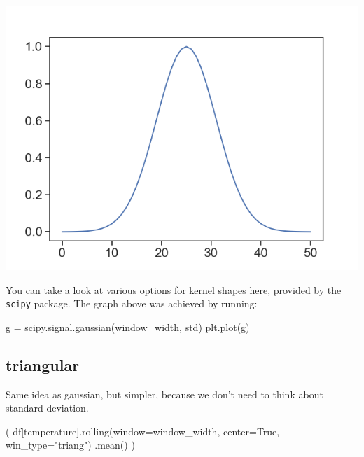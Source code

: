 \documentclass[
  letterpaper,
  DIV=11,
  numbers=noendperiod,
  oneside]{scrreprt}
\newenvironment{Shaded}{\begin{snugshade}}{\end{snugshade}}
\newcommand{\NormalTok}[1]{\textcolor[rgb]{0.00,0.23,0.31}{#1}}
\newcommand{\OperatorTok}[1]{\textcolor[rgb]{0.37,0.37,0.37}{#1}}
\newcommand{\StringTok}[1]{\textcolor[rgb]{0.13,0.47,0.30}{#1}}
\newcommand{\VariableTok}[1]{\textcolor[rgb]{0.07,0.07,0.07}{#1}}
\begin{document}
\includegraphics{smoothing/gaussian_kernel.png}

You can take a look at various options for kernel shapes
\href{https://docs.scipy.org/doc/scipy/reference/signal.windows.html\#module-scipy.signal.windows}{here},
provided by the \texttt{scipy} package. The graph above was achieved by
running:

\begin{Shaded}
\begin{Highlighting}[]
\NormalTok{g }\OperatorTok{=}\NormalTok{ scipy.signal.gaussian(window\_width, std)}
\NormalTok{plt.plot(g)}
\end{Highlighting}
\end{Shaded}

\hypertarget{triangular}{%
\subsection{triangular}\label{triangular}}

Same idea as gaussian, but simpler, because we don't need to think about
standard deviation.

\begin{Shaded}
\begin{Highlighting}[]
\NormalTok{(}
\NormalTok{df[}\StringTok{\textquotesingle{}temperature\textquotesingle{}}\NormalTok{].rolling(window}\OperatorTok{=}\NormalTok{window\_width,}
\NormalTok{                          center}\OperatorTok{=}\VariableTok{True}\NormalTok{,}
\NormalTok{                          win\_type}\OperatorTok{=}\StringTok{"triang"}\NormalTok{)}
\NormalTok{                 .mean()}
\NormalTok{)}
\end{Highlighting}
\end{Shaded}
\end{document}
